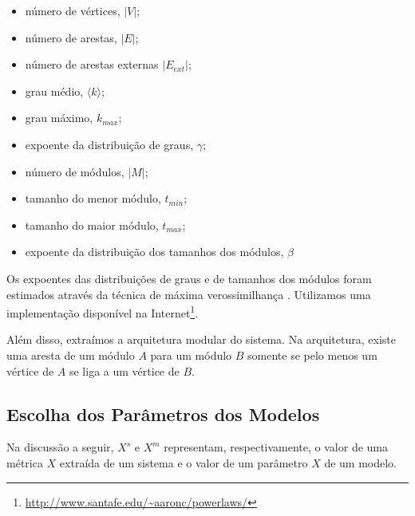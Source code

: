 \documentclass{acm_proc_article-sp}
\begin{document}
\begin{itemize}
\item número de vértices, $|V|$;
\item número de arestas, $|E|$;
\item número de arestas externas $|E_{ext}|$;
\item grau médio, $\langle k \rangle$;
\item grau máximo, $k_{max}$;
\item expoente da distribuição de graus, $\gamma$;
\item número de módulos, $|M|$;
\item tamanho do menor módulo, $t_{min}$;
\item tamanho do maior módulo, $t_{max}$;
\item expoente da distribuição dos tamanhos dos módulos, $\beta$
\end{itemize}

Os expoentes das distribuições de graus e de tamanhos dos módulos foram estimados através da técnica de máxima verossimilhança \cite{Clauset2007}. Utilizamos uma implementação disponível na Internet\footnote{\url{http://www.santafe.edu/~aaronc/powerlaws/}}.

Além disso, extraímos a arquitetura modular do sistema. Na arquitetura, existe uma aresta de um módulo $A$ para um módulo $B$ somente se pelo menos um vértice de $A$ se liga a um vértice de $B$.

\subsection{Escolha dos Parâmetros dos Modelos}

Na discussão a seguir, $X^s$ e $X^m$ representam, respectivamente, o valor de uma métrica $X$ extraída de um sistema e o valor de um parâmetro $X$ de um modelo.


\end{document}

